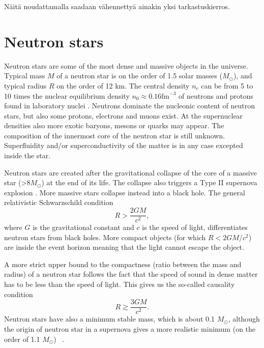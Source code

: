 \documentclass{wihuri}
\def\be{\begin{equation}}
\def\ee{\end{equation}}
\begin{document}
Näitä noudattamalla saadaan vähennettyä ainakin yksi tarkastuskierros.

\fi

\section{Neutron stars}


Neutron stars are some of the most dense and massive objects in the
universe. Typical mass $M$ of a neutron star is on the order of 1.5 solar masses ($M_{\odot}$), and typical radius $R$ on the order of 12 km. The central density $n_{c}$ can be from 5 to 10 times the nuclear equilibrium density $n_{0} \approx 0.16 \mathrm{fm}^{-3}$ of neutrons and protons found in laboratory nuclei \cite{lattimer}. Neutrons dominate the nucleonic content of neutron stars, but also some protons, electrons and muons exist. At the supernuclear densities also more exotic baryons, mesons or quarks may appear. The composition of the innermost core of the neutron star is still unknown. Superfluidity and/or superconductivity of the matter %
is in any case excepted inside the star. 

 
Neutron stars are created after the gravitational collapse of the core of a
massive star (>8$M_{\odot}$) at the end of its life. The collapse also triggers a Type II supernova explosion \cite{lattimer}. More massive stars collapse instead into a black hole. The general relativistic Schwarzschild condition 
\be \label{eq:schw_cond}
 R > \frac{2GM}{c^{2}},
\ee 
where $G$ is the gravitational constant and $c$ is the speed of light, %
differentiates neutron stars from black holes. More compact objects (for which $R < 2GM/c^{2}$) are inside the event horizon meaning that the light cannot escape the object.


A more strict upper bound to the compactness (ratio between the mass and radius) of a neutron star follows
the fact \cite{rhoades} %
that the speed of sound in dense matter has to be less than the speed of light. This gives us the so-called causality condition
\be \label{eq:causality}
 R \gtrsim \frac{3GM}{c^{2}}.
\ee 
Neutron stars have also a minimum stable mass, which is about 0.1 $M_{\odot}$, although the origin of neutron star in a supernova gives a more realistic minimum (on the order of 1.1 $M_{\odot}$) ~\cite{lattimer2013}.
\end{document}
